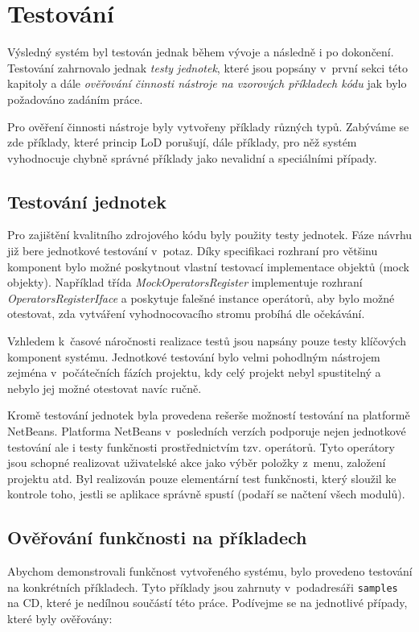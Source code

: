 \chapter{Testování}

Výsledný systém byl testován jednak během vývoje a následně i po dokončení. Testování zahrnovalo jednak \emph{testy jednotek}, které jsou popsány v~první sekci této kapitoly a dále \emph{ověřování činnosti nástroje na vzorových příkladech kódu} jak bylo požadováno zadáním práce.

Pro ověření činnosti nástroje byly vytvořeny příklady různých typů. Zabýváme se zde příklady, které princip LoD porušují, dále příklady, pro něž systém vyhodnocuje chybně správné příklady jako nevalidní a speciálními případy.

\section{Testování jednotek}
Pro zajištění kvalitního zdrojového kódu byly použity testy jednotek. Fáze návrhu již bere jednotkové testování v~potaz. Díky specifikaci rozhraní pro většinu komponent bylo možné poskytnout vlastní testovací implementace objektů (mock objekty). Například třída \emph{MockOperatorsRegister} implementuje rozhraní \emph{OperatorsRegisterIface} a poskytuje falešné instance operátorů, aby bylo možné otestovat, zda vytváření vyhodnocovacího stromu probíhá dle očekávání.

Vzhledem k~časové náročnosti realizace testů jsou napsány pouze testy klíčových komponent systému. Jednotkové testování bylo velmi pohodlným nástrojem zejména v~počátečních fázích projektu, kdy celý projekt nebyl spustitelný a nebylo jej možné otestovat navíc ručně.

Kromě testování jednotek byla provedena rešerše možností testování na platformě NetBeans. Platforma NetBeans v~posledních verzích podporuje nejen jednotkové testování ale i testy funkčnosti prostřednictvím tzv. operátorů. Tyto operátory jsou schopné realizovat uživatelské akce jako výběr položky z~menu, založení projektu atd. Byl realizován pouze elementární test funkčnosti, který sloužil ke kontrole toho, jestli se aplikace správně spustí (podaří se načtení všech modulů).

\section{Ověřování funkčnosti na příkladech}
Abychom demonstrovali funkčnost vytvořeného systému, bylo provedeno testování na konkrétních příkladech. Tyto příklady jsou zahrnuty v~podadresáři \verb+samples+ na CD, které je nedílnou součástí této práce. Podívejme se na jednotlivé případy, které byly ověřovány:

